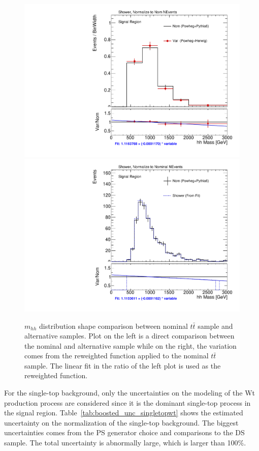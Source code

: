 \begin{figure}[!htbp]
\begin{center}
\includegraphics[scale=0.33]{./figures/boosted/systematics/ttbar_alt_hhMass_SR_Shower_rebin}
\includegraphics[scale=0.33]{./figures/boosted/systematics/ttbar_fromfit_hhMass_SR_Shower}   \\
\caption{$m_{hh}$ distribution shape comparison between nominal $t\bar{t}$ sample and alternative samples. Plot on the left is a direct
comparison between the nominal and alternative sample while on the right, the variation comes from the reweighted function applied to
the nominal $t\bar{t}$ sample. The linear fit in the ratio of the left plot is used as the reweighted function.}
\label{fig:boosted_unc_ttbar_shape_sr}
\end{center}
\end{figure}
 
For the single-top background, only the uncertainties on the modeling of the Wt production process are considered since it is the dominant single-top process in the
signal region. Table~\ref{tab:boosted_unc_singletopwt} shows the estimated uncertainty on the normalization of the single-top background. The biggest uncertainties comes from
the PS generator choice and comparisons to the DS sample. The total uncertainty is abnormally large, which is larger than 100\%.
 
